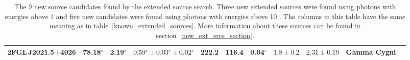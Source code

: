 \documentclass[12pt,preprint]{aastex}
\newcommand{\gev}{\text{GeV}\xspace}
\renewcommand{\deg}{\ensuremath{^\circ}\xspace}
\begin{document}
\begin{table}
\begin{centering}
\begin{tabular}{l|rrlrrrrrrr}
      2FGL\,J2021.5+4026   &      78.18\deg &       2.19\deg & $  0.59\deg \pm   0.03\deg \pm   0.02\deg $ &      222.2 &      116.4 &   0.04\deg & $    1.8 \pm     0.2$ & $   2.31 \pm    0.19$ &          Gamma Cygni \\
      \hline
  \end{tabular}
    \caption{The 9 new source candidates found by the extended source
    search. Three new extended sources were found using photons with
    energies above 1 \gev and five new candidates were found using
    photons with energies above 10 \gev.  The columns in this table
    have the same meaning as in table~\ref{known_extended_sources}.
    More information about these sources can be found in
    section~\ref{new_ext_srcs_section}.
    }
    \label{new_ext_srcs_table}
  \end{centering}
\end{table}
\end{document}
